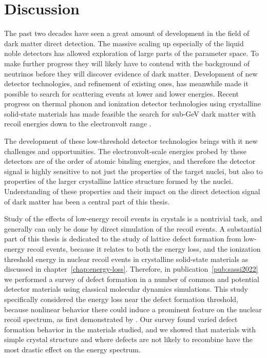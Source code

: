 \chapter{Discussion}

The past two decades have seen a great amount of development in the field of dark matter direct detection. The massive scaling up especially of the liquid noble detectors has allowed exploration of large parts of the parameter space. To make further progress they will likely have to contend with the background of neutrinos before they will discover evidence of dark matter. Development of new detector technologies, and refinement of existing ones, has meanwhile made it possible to search for scattering events at lower and lower energies. Recent progress on thermal phonon and ionization detector technologies using crystalline solid-state materials has made feasible the search for sub-GeV dark matter with recoil energies down to the electronvolt range \parencites{RomaniEtAl2018, CrislerEtAl2018, EDELWEISS2020}.

The development of these low-threshold detector technologies brings with it new challenges and opportunities. The electronvolt-scale energies probed by these detectors are of the order of atomic binding energies, and therefore the detector signal is highly sensitive to not just the properties of the target nuclei, but also to properties of the larger crystalline lattice structure formed by the nuclei. Understanding of these properties and their impact on the direct detection signal of dark matter has been a central part of this thesis.

Study of the effects of low-energy recoil events in crystals is a nontrivial task, and generally can only be done by direct simulation of the recoil events. A substantial part of this thesis is dedicated to the study of lattice defect formation from low-energy recoil events, because it relates to both the energy loss, and the ionization threshold energy in nuclear recoil events in crystalline solid-state materials as discussed in chapter~\ref{chap:energy-loss}. Therefore, in publication~\ref{pub:sassi2022} we performed a survey of defect formation in a number of common and potential detector materials using classical molecular dynamics simulations. This study specifically considered the energy loss near the defect formation threshold, because nonlinear behavior there could induce a prominent feature on the nuclear recoil spectrum, as first demonstrated by \textcite{KadribasicEtAl2020}. Our survey found varied defect formation behavior in the materials studied, and we showed that materials with simple crystal structure and where defects are not likely to recombine have the most drastic effect on the energy spectrum.

